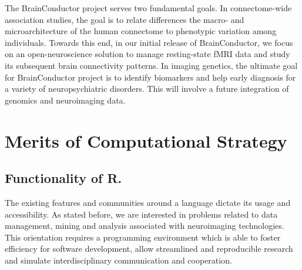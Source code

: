 \documentclass{nature}
\begin{document}
The BrainConductor project serves two fundamental goals. In connectome-wide
association studies, the goal is to relate differences the macro- and
microarchitecture of the human connectome to phenotypic variation among
individuals\cite{milham2012open}. Towards this end,
in our
initial release of BrainConductor, we focus on an open-neuroscience
solution to manage resting-state fMRI data and study its
subsequent brain connectivity patterns.
In imaging genetics, the ultimate goal
for BrainConductor project is to identify biomarkers and help early diagnosis
for a variety of neuropsychiatric disorders. This will involve a future
integration of genomics and neuroimaging data.


\section{Merits of Computational Strategy}

\subsection{Functionality of R.}
The existing features and communities around a language dictate
its usage and accessibility. As stated before, we are
interested in problems related to data management, mining and analysis
associated with neuroimaging technologies. This orientation requires
a programming environment which is able to foster
efficiency for software development, allow
streamlined and reproducible research and simulate
interdisciplinary communication and cooperation.
\end{document}
